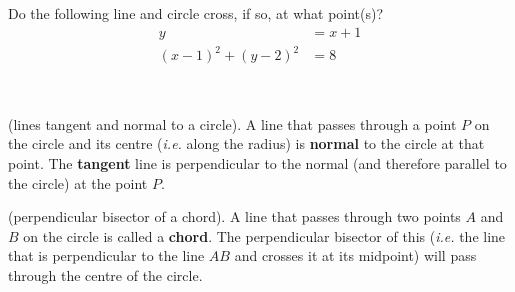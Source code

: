 \begin{example} 
Do the following line and circle cross, if so, at what point(s)?
\begin{align*}
    y &= x + 1 \\
    (x - 1)^2 + (y-2)^2 &= 8
\end{align*}
\end{example} 
\\

\begin{definition}
    (lines tangent and normal to a circle). A line that passes through a point $P$ on the circle and its centre (\emph{i.e.} along the radius) is \textbf{normal} to the circle at that point. The \textbf{tangent} line is perpendicular to the normal (and therefore parallel to the circle) at the point $P$.
\end{definition}

\begin{definition}
    (perpendicular bisector of a chord). A line that passes through two points $A$ and $B$ on the circle is called a \textbf{chord}. The perpendicular bisector of this (\emph{i.e.} the line that is perpendicular to the line $AB$ and crosses it at its midpoint) will pass through the centre of the circle. %
\end{definition}

